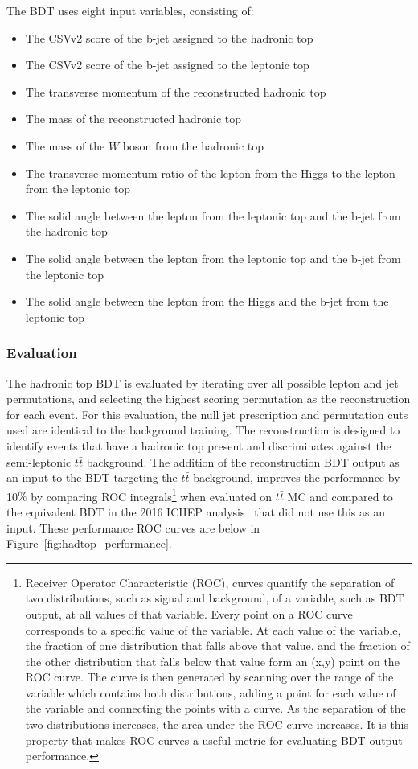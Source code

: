 The BDT uses eight input variables, consisting of:
\begin{itemize}
\item The CSVv2 score of the b-jet assigned to the hadronic top
\item The CSVv2 score of the b-jet assigned to the leptonic top
\item The transverse momentum of the reconstructed hadronic top
\item The mass of the reconstructed hadronic top
\item The mass of the $W$ boson from the hadronic top
\item The transverse momentum ratio of the lepton from the Higgs to the lepton from the leptonic top
\item The solid angle between the lepton from the leptonic top and the b-jet from the hadronic top
\item The solid angle between the lepton from the leptonic top and the b-jet from the leptonic top
\item The solid angle between the lepton from the Higgs and the b-jet from the leptonic top
\end{itemize}

\subsubsection{Evaluation}
The hadronic top BDT is evaluated by iterating over all possible lepton and jet
permutations, and selecting the highest scoring permutation as the reconstruction for
each event. For this evaluation, the null jet prescription and permutation
cuts used are identical to the background training.
The reconstruction is designed to identify events that have a hadronic top present and
discriminates against the semi-leptonic $t\bar{t}$ background. The addition of the 
reconstruction BDT output as an input to the BDT targeting the $t\bar{t}$ background,
improves the performance by 10$\%$ by comparing ROC integrals\footnote{Receiver Operator Characteristic (ROC), curves quantify the separation of two distributions, such as signal and background,
of a variable, such as BDT output, at all values of that variable. Every point on a ROC curve corresponds to a specific value of the variable. At each value of the variable, the fraction of one
distribution that falls above that value, and the fraction of the other distribution that falls below that value form an (x,y) point on the ROC curve. The curve is then generated by scanning over
the range of the variable which contains both distributions, adding a point for each value of the variable and connecting the points with a curve. As the separation of the two distributions increases,
the area under the ROC curve increases. It is this property that makes ROC curves a useful metric for evaluating BDT output performance.}
when evaluated on $t\bar{t}$ MC and compared to the
equivalent BDT in the 2016 \tth ICHEP analysis~\cite{CMS-AN-16-022} that did not use this
as an input. These performance ROC curves are below in Figure~\ref{fig:hadtop_performance}.

